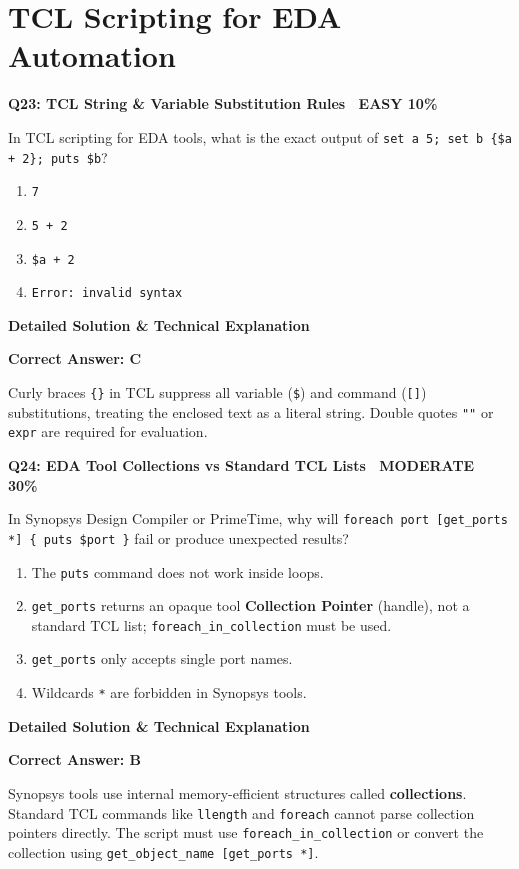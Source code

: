 \documentclass[11pt,a4paper]{article}
\newcommand{\badgemod}{{\color{white}\colorbox{modoran}{\bfseries\sffamily\tiny\ MODERATE 30\%\ }}}
\newcommand{\badgeeasy}{{\color{white}\colorbox{easygreen}{\bfseries\sffamily\tiny\ EASY 10\%\ }}}
\newenvironment{qbox}[2]{%
  \begin{mdframed}[style=qstyle]%
  {\bfseries\sffamily\color{primaryblue}#1 \hfill #2}\par\vspace{2pt}%
}{%
  \end{mdframed}%
}
\newenvironment{ansbox}{%
  \begin{mdframed}[style=ansstyle]%
  {\bfseries\sffamily\color{ansgreen}\small Detailed Solution \& Technical Explanation}\par\vspace{2pt}\small%
}{%
  \end{mdframed}%
}
\begin{document}
\section{TCL Scripting for EDA Automation}

\begin{qbox}{Q23: TCL String \& Variable Substitution Rules}{\badgeeasy}
In TCL scripting for EDA tools, what is the exact output of \texttt{set a 5; set b \{\$a + 2\}; puts \$b}?
\begin{enumerate}[label=\textbf{\Alph*.}]
  \item \texttt{7}
  \item \texttt{5 + 2}
  \item \texttt{\$a + 2}
  \item \texttt{Error: invalid syntax}
\end{enumerate}
\end{qbox}
\begin{ansbox}
\textbf{Correct Answer: C}

Curly braces \texttt{\{\}} in TCL suppress all variable (\texttt{\$}) and command (\texttt{[]}) substitutions, treating the enclosed text as a literal string. Double quotes \texttt{""} or \texttt{expr} are required for evaluation.
\end{ansbox}

\begin{qbox}{Q24: EDA Tool Collections vs Standard TCL Lists}{\badgemod}
In Synopsys Design Compiler or PrimeTime, why will \texttt{foreach port [get\_ports *] \{ puts \$port \}} fail or produce unexpected results?
\begin{enumerate}[label=\textbf{\Alph*.}]
  \item The \texttt{puts} command does not work inside loops.
  \item \texttt{get\_ports} returns an opaque tool \textbf{Collection Pointer} (handle), not a standard TCL list; \texttt{foreach\_in\_collection} must be used.
  \item \texttt{get\_ports} only accepts single port names.
  \item Wildcards \texttt{*} are forbidden in Synopsys tools.
\end{enumerate}
\end{qbox}
\begin{ansbox}
\textbf{Correct Answer: B}

Synopsys tools use internal memory-efficient structures called \textbf{collections}. Standard TCL commands like \texttt{llength} and \texttt{foreach} cannot parse collection pointers directly. The script must use \texttt{foreach\_in\_collection} or convert the collection using \texttt{get\_object\_name [get\_ports *]}.
\end{ansbox}
\end{document}
